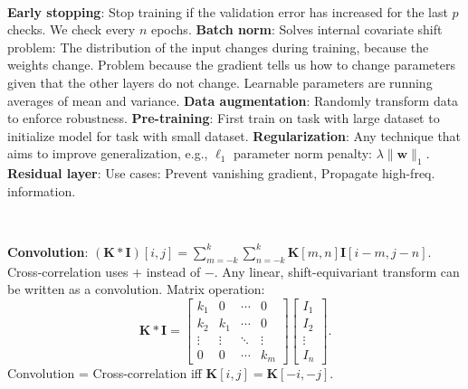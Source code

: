 \documentclass{article}
\renewcommand{\vec}[1]{\bm{#1}}
\newcommand{\mat}[1]{\bm{#1}}
\newenvironment{topic}[1]
{\textbf{\sffamily \colorbox{black}{\rlap{\textbf{\textcolor{white}{#1}}}\hspace{\linewidth}\hspace{-2\fboxsep}}} \\ \vspace{0.2cm}}
{}
\begin{document}
\begin{multicols*}{2}
\begin{topic}{Neural networks}
        \textbf{Early stopping}: Stop training if the validation error has increased for the last
        $p$ checks. We check every $n$ epochs. \textbf{Batch norm}: Solves internal covariate shift
        problem: The distribution of the input changes during training, because the weights change.
        Problem because the gradient tells us how to change parameters given that the other
        layers do not change. Learnable parameters are running averages of mean and variance.
        \textbf{Data augmentation}: Randomly transform data to enforce robustness.
        \textbf{Pre-training}: First train on task with large dataset to initialize model for task
        with small dataset. \textbf{Regularization}: Any technique that aims to improve
        generalization, e.g., $\ell_1$ parameter norm penalty: $\lambda \| \vec{w} \|_1$.
        \textbf{Residual layer}: Use cases: Prevent vanishing gradient, Propagate high-freq. information.

    \end{topic}

    \begin{topic}{Convolutional neural networks}

        \textbf{Convolution}: $(\mat{K} * \mat{I})[i,j] = \sum_{m=-k}^{k} \sum_{n=-k}^{k} \mat{K}[m,n] \mat{I}[i-m, j-n]$.
        Cross-correlation uses $+$ instead of $-$. Any linear, shift-equivariant transform can be
        written as a convolution. Matrix operation: \[
            \mat{K} * \mat{I} = \begin{bmatrix}
                k_1    & 0      & \cdots & 0      \\
                k_2    & k_1    & \cdots & 0      \\
                \vdots & \vdots & \ddots & \vdots \\
                0      & 0      & \cdots & k_m
            \end{bmatrix}
            \begin{bmatrix}
                I_1 \\ I_2 \\ \vdots \\ I_n
            \end{bmatrix}.
        \]
        Convolution = Cross-correlation iff $\mat{K}[i,j] = \mat{K}[-i,-j]$.


\end{topic}
\end{multicols*}
\end{document}

